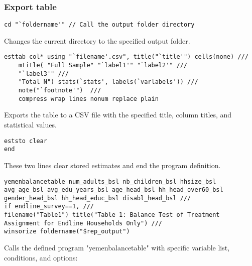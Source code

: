 \documentclass{article}
\begin{document}
\subsubsection{Export table}

\begin{mdframed}
\begin{verbatim}
cd "`foldername'" // Call the output folder directory 
\end{verbatim}
\end{mdframed}

Changes the current directory to the specified output folder.



\begin{mdframed}
\begin{verbatim}
esttab col* using "`filename'.csv", title("`title'") cells(none) ///
	mtitle( "Full Sample" "`label1'" "`label2'" ///
	"`label3'" ///
	"Total N") stats(`stats', labels(`varlabels')) ///
	note("`footnote'")  ///
	compress wrap lines nonum replace plain
\end{verbatim}
\end{mdframed}

Exports the table to a CSV file with the specified title, column titles, and statistical values.


\begin{mdframed}
\begin{verbatim}
eststo clear
end
\end{verbatim}
\end{mdframed}

These two lines clear stored estimates and end the program definition.



\begin{mdframed}
\begin{lstlisting}[breaklines=true]
yemenbalancetable num_adults_bsl nb_children_bsl hhsize_bsl avg_age_bsl avg_edu_years_bsl age_head_bsl hh_head_over60_bsl gender_head_bsl hh_head_educ_bsl disabl_head_bsl ///
if endline_survey==1, ///
filename("Table1") title("Table 1: Balance Test of Treatment Assignment for Endline Households Only") ///
winsorize foldername("$rep_output")
\end{lstlisting}
\end{mdframed}

Calls the defined program "yemenbalancetable" with specific variable list, conditions, and options:
\end{document}
